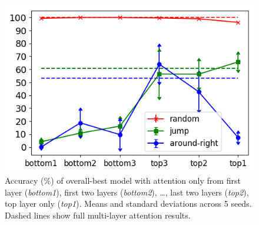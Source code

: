 \begin{figure}[tb]
    \centering
    \includegraphics[width=.48\textwidth,keepaspectratio]{figures/attention_exp.png}
    \caption{Accuracy (\%) of overall-best model with attention
      only from first layer (\emph{bottom1}), first two layers
      (\emph{bottom2}), \ldots, last two layers (\emph{top2}), top
      layer only (\emph{top1}). Means and standard deviations across 5
      seeds. Dashed lines show full multi-layer attention results.}
    \label{fig:exp3}
\end{figure}

